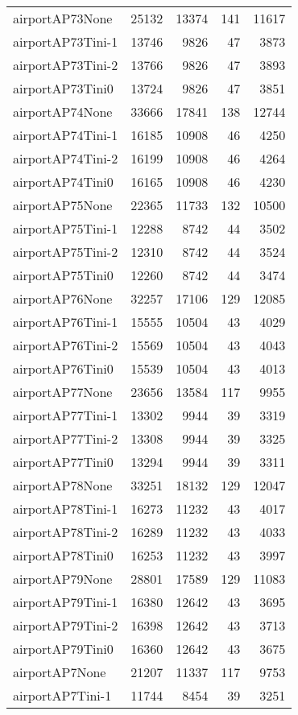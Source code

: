 \begin{longtable}{lrrrr}
airportAP73None & 25132 & 13374 & 141 & 11617 \\
airportAP73Tini-1 & 13746 & 9826 & 47 & 3873 \\
airportAP73Tini-2 & 13766 & 9826 & 47 & 3893 \\
airportAP73Tini0 & 13724 & 9826 & 47 & 3851 \\
airportAP74None & 33666 & 17841 & 138 & 12744 \\
airportAP74Tini-1 & 16185 & 10908 & 46 & 4250 \\
airportAP74Tini-2 & 16199 & 10908 & 46 & 4264 \\
airportAP74Tini0 & 16165 & 10908 & 46 & 4230 \\
airportAP75None & 22365 & 11733 & 132 & 10500 \\
airportAP75Tini-1 & 12288 & 8742 & 44 & 3502 \\
airportAP75Tini-2 & 12310 & 8742 & 44 & 3524 \\
airportAP75Tini0 & 12260 & 8742 & 44 & 3474 \\
airportAP76None & 32257 & 17106 & 129 & 12085 \\
airportAP76Tini-1 & 15555 & 10504 & 43 & 4029 \\
airportAP76Tini-2 & 15569 & 10504 & 43 & 4043 \\
airportAP76Tini0 & 15539 & 10504 & 43 & 4013 \\
airportAP77None & 23656 & 13584 & 117 & 9955 \\
airportAP77Tini-1 & 13302 & 9944 & 39 & 3319 \\
airportAP77Tini-2 & 13308 & 9944 & 39 & 3325 \\
airportAP77Tini0 & 13294 & 9944 & 39 & 3311 \\
airportAP78None & 33251 & 18132 & 129 & 12047 \\
airportAP78Tini-1 & 16273 & 11232 & 43 & 4017 \\
airportAP78Tini-2 & 16289 & 11232 & 43 & 4033 \\
airportAP78Tini0 & 16253 & 11232 & 43 & 3997 \\
airportAP79None & 28801 & 17589 & 129 & 11083 \\
airportAP79Tini-1 & 16380 & 12642 & 43 & 3695 \\
airportAP79Tini-2 & 16398 & 12642 & 43 & 3713 \\
airportAP79Tini0 & 16360 & 12642 & 43 & 3675 \\
airportAP7None & 21207 & 11337 & 117 & 9753 \\
airportAP7Tini-1 & 11744 & 8454 & 39 & 3251 \\

\end{longtable}
